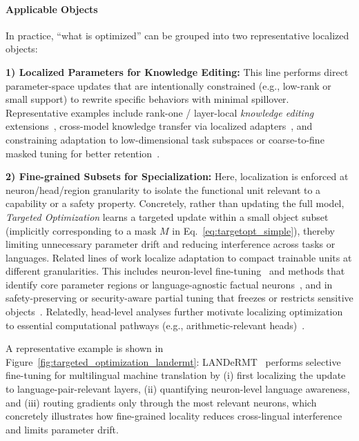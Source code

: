\documentclass[11pt,letterpaper]{mystyle}
\begin{document}
\paragraph{Applicable Objects}
In practice, ``what is optimized'' can be grouped into two representative localized objects:

\textbf{1) Localized Parameters for Knowledge Editing:}
This line performs direct parameter-space updates that are intentionally constrained (e.g., low-rank or small support) to rewrite specific behaviors with minimal spillover. Representative examples include rank-one / layer-local \textit{knowledge editing} extensions~\citep{meng2022ccs,meng2023massediting}, cross-model knowledge transfer via localized adapters~\citep{zhong2024seeking}, and constraining adaptation to low-dimensional task subspaces or coarse-to-fine masked tuning for better retention~\citep{zhang-etal-2023-fine,zhang2024cofitune}.

\textbf{2) Fine-grained Subsets for Specialization:}
Here, localization is enforced at neuron/head/region granularity to isolate the functional unit relevant to a capability or a safety property. Concretely, rather than updating the full model, \textit{Targeted Optimization} learns a targeted update within a small object subset (implicitly corresponding to a mask $M$ in Eq.~\ref{eq:targetopt_simple}), thereby limiting unnecessary parameter drift and reducing interference across tasks or languages. Related lines of work localize adaptation to compact trainable units at different granularities. This includes neuron-level fine-tuning~\citep{xu-etal-2025-lets} and methods that identify core parameter regions or language-agnostic factual neurons~\citep{xirobusttickets,zhouORTicket,zhang2024lulafns}, and in safety-preserving or security-aware partial tuning that freezes or restricts sensitive objects~\citep{li2025safety,du2024tst,liPrecisionKnowledgeEditing2024}. Relatedly, head-level analyses further motivate localizing optimization to essential computational pathways (e.g., arithmetic-relevant heads)~\citep{zhang2024interpreting}.

A representative example is shown in Figure~\ref{fig:targeted_optimization_landermt}: LANDeRMT~\citep{zhu-etal-2024-landermt} performs selective fine-tuning for multilingual machine translation by (i) first localizing the update to language-pair-relevant layers, (ii) quantifying neuron-level language awareness, and (iii) routing gradients only through the most relevant neurons, which concretely illustrates how fine-grained locality reduces cross-lingual interference and limits parameter drift.
\end{document}
